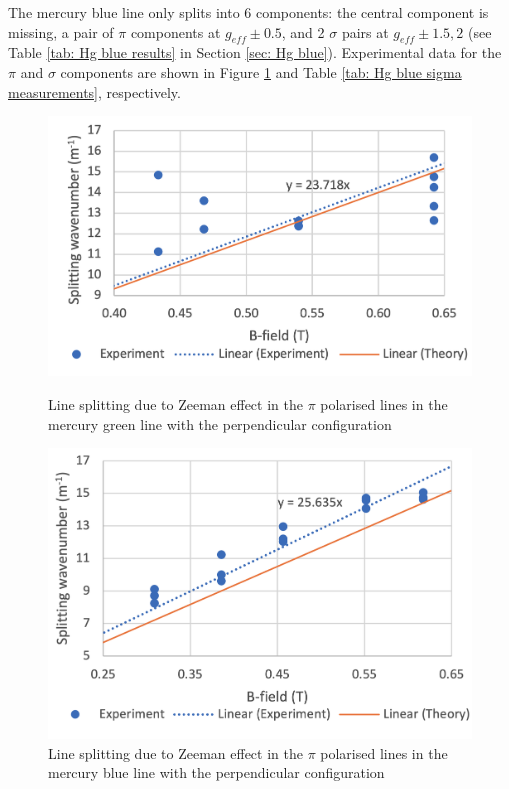 \documentclass[11pt]{article}
\begin{document}
The mercury blue line only splits into 6 components: the central component is missing, a pair of $\pi$ components at $g_{eff} \pm 0.5$, and 2 $\sigma$ pairs at $g_{eff} \pm 1.5, 2$ (see Table \ref{tab: Hg blue results} in Section \ref{sec: Hg blue}). Experimental data for the $\pi$ and $\sigma$ components are shown in Figure \ref{fig: Hg blue pi} and Table \ref{tab: Hg blue sigma measurements}, respectively.
\begin{figure}[h!]
\centering
    \begin{minipage}[c]{0.47\textwidth}
        \centering
        \includegraphics[width=\linewidth]{Hg green pi perp small.png}
        \captionsetup{width=0.8\linewidth}
        \caption{Line splitting due to Zeeman effect in the $\pi$ polarised lines in the mercury green line with the perpendicular configuration}
        \label{fig: Hg green pi}
    \end{minipage}
    \begin{minipage}[c]{0.47\textwidth}
        \centering
        \includegraphics[width=\linewidth]{Hg blue pi perp small.png}
        \captionsetup{width=0.9\linewidth}
        \caption{Line splitting due to Zeeman effect in the $\pi$ polarised lines in the mercury blue line with the perpendicular configuration}
        \label{fig: Hg blue pi}
    \end{minipage}
\end{figure}
\end{document}

